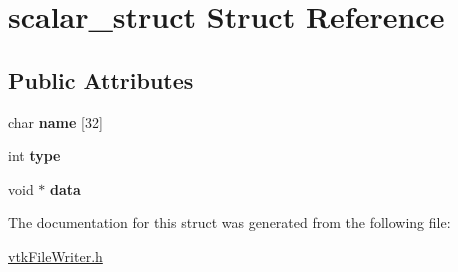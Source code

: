 \hypertarget{structscalar__struct}{
\section{scalar\_\-struct Struct Reference}
\label{structscalar__struct}
}
\subsection*{Public Attributes}
\begin{DoxyCompactItemize}
\item 
\hypertarget{structscalar__struct_a7661cd7a0844bbd72a886a3b5df26cd4}{
char {\bfseries name} \mbox{[}32\mbox{]}}
\label{structscalar__struct_a7661cd7a0844bbd72a886a3b5df26cd4}

\item 
\hypertarget{structscalar__struct_abb1e3a7830774d253d168511eb289ccf}{
int {\bfseries type}}
\label{structscalar__struct_abb1e3a7830774d253d168511eb289ccf}

\item 
\hypertarget{structscalar__struct_a6910093677542659c782ad388b193741}{
void $\ast$ {\bfseries data}}
\label{structscalar__struct_a6910093677542659c782ad388b193741}

\end{DoxyCompactItemize}


The documentation for this struct was generated from the following file:\begin{DoxyCompactItemize}
\item 
\hyperlink{vtkFileWriter_8h}{vtkFileWriter.h}\end{DoxyCompactItemize}
